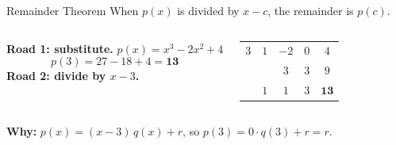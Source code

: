 \documentclass[aspectratio=169, 11pt]{beamer}
\begin{document}
\begin{frame}[t, plain]

  \begin{block}{Remainder Theorem}
    When $p(x)$ is divided by $x - c$, the remainder is $p(c)$.
  \end{block}

  \medskip
  \begin{columns}[T]
      \textbf{Road 1: substitute.} \quad $p(x) = x^3 - 2x^2 + 4$
      \[ p(3) = 27 - 18 + 4 = \mathbf{13} \]
      \textbf{Road 2: divide by $x - 3$.}

      \smallskip
      \begin{center}
      {\setlength{\tabcolsep}{5pt}\begin{tabular}{c|cccc}
        $3$ & $1$ & $-2$ & $0$ & $4$ \\
            &     & $3$  & $3$ & $9$ \\ \hline
            & $1$ & $1$  & $3$ & {\color{redacc}$\mathbf{13}$} \\
      \end{tabular}}
      \end{center}
  \end{columns}

  \medskip
  \textbf{Why:} $p(x) = (x - 3)\,q(x) + r$, so $p(3) = 0 \cdot q(3) + r = r$.
\end{frame}
\end{document}
